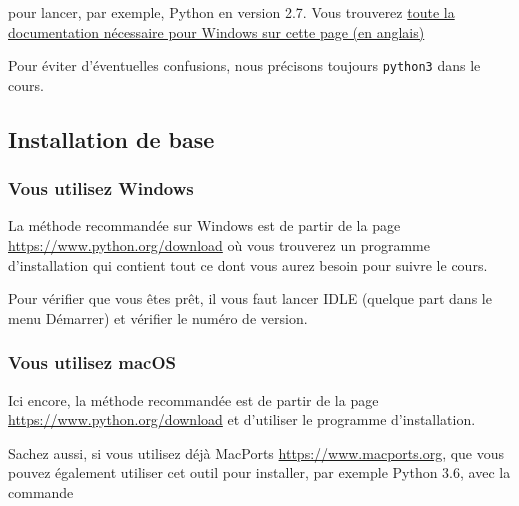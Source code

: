 \begin{Shaded}
\begin{Highlighting}[frame=lines,framerule=0.6mm,rulecolor=\color{asisframecolor}]
\NormalTok{:}\DataTypeTok{\textbackslash{}>}
\end{Highlighting}
\end{Shaded}

pour lancer, par exemple, Python en version 2.7. Vous trouverez
\href{https://docs.python.org/3/using/windows.html}{toute la
documentation nécessaire pour Windows sur cette page (en anglais)}

Pour éviter d'éventuelles confusions, nous précisons toujours
\texttt{python3} dans le cours.

    \hypertarget{installation-de-base}{%
\subsection{Installation de base}\label{installation-de-base}}

    \hypertarget{vous-utilisez-windows}{%
\subsubsection{Vous utilisez Windows}\label{vous-utilisez-windows}}

    La méthode recommandée sur Windows est de partir de la page
\url{https://www.python.org/download} où vous trouverez un programme
d'installation qui contient tout ce dont vous aurez besoin pour suivre
le cours.

Pour vérifier que vous êtes prêt, il vous faut lancer IDLE (quelque part
dans le menu Démarrer) et vérifier le numéro de version.

    \hypertarget{vous-utilisez-macos}{%
\subsubsection{Vous utilisez macOS}\label{vous-utilisez-macos}}

    Ici encore, la méthode recommandée est de partir de la page
\url{https://www.python.org/download} et d'utiliser le programme
d'installation.

Sachez aussi, si vous utilisez déjà MacPorts
\url{https://www.macports.org}, que vous pouvez également utiliser cet
outil pour installer, par exemple Python 3.6, avec la commande

    \begin{Shaded}
\begin{Highlighting}[frame=lines,framerule=0.6mm,rulecolor=\color{asisframecolor}]
\NormalTok{$ }
\end{Highlighting}
\end{Shaded}

